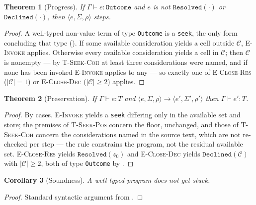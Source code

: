 \documentclass[11pt,a4paper]{article}
\theoremstyle{clstyle}
\newtheorem{theorem}{Theorem}[section]
\newtheorem{corollary}[theorem]{Corollary}
\theoremstyle{definition}
\theoremstyle{remark}
\newcommand{\abs}[1]{\lvert#1\rvert}
\begin{document}
\begin{theorem}[Progress]
\label{thm:progress}
If $\Gamma\vdash e:\texttt{Outcome}$ and $e$ is not
$\texttt{Resolved}(\cdot)$ or $\texttt{Declined}(\cdot)$, then
$\langle e,\Sigma,\rho\rangle$ steps.
\end{theorem}

\begin{proof}
A well-typed non-value term of type \texttt{Outcome} is a \texttt{seek}, the
only form concluding that type
(). If some available consideration
yields a cell outside $\mathcal{C}$, \textsc{E-Invoke} applies. Otherwise
every available consideration yields a cell in $\mathcal{C}$; then
$\mathcal{C}$ is nonempty --- by \textsc{T-Seek-Coh} at least three
considerations were named, and if none has been invoked \textsc{E-Invoke}
applies to any --- so exactly one of \textsc{E-Close-Res}
($\abs{\mathcal{C}}=1$) or \textsc{E-Close-Dec} ($\abs{\mathcal{C}}\ge2$)
applies.
\end{proof}

\begin{theorem}[Preservation]
\label{thm:preservation}
If $\Gamma\vdash e:T$ and $\langle e,\Sigma,\rho\rangle\longrightarrow
\langle e',\Sigma',\rho'\rangle$ then $\Gamma\vdash e':T$.
\end{theorem}

\begin{proof}
By cases. \textsc{E-Invoke} yields a \texttt{seek} differing only in the
available set and store; the premises of \textsc{T-Seek-Pos} concern the
floor, unchanged, and those of \textsc{T-Seek-Coh} concern the considerations
named in the source text, which are not re-checked per step --- the rule
constrains the program, not the residual available set. \textsc{E-Close-Res}
yields $\texttt{Resolved}(z_0)$ and \textsc{E-Close-Dec} yields
$\texttt{Declined}(\mathcal{C})$ with $\abs{\mathcal{C}}\ge2$, both of type
\texttt{Outcome} by .
\end{proof}

\begin{corollary}[Soundness]
\label{cor:soundness}
A well-typed program does not get stuck.
\end{corollary}

\begin{proof}
Standard syntactic argument from 
\citep{wright1994syntactic,pierce2002types}.
\end{proof}
\end{document}

